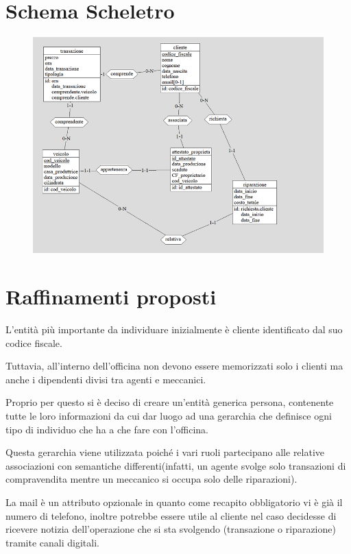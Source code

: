 \documentclass[a4paper,12pt]{report}
\begin{document}
\section{Schema Scheletro}
	\begin{figure}[H]
		\centering
		\includegraphics[scale=1]{img/schema_scheletro.png}
	\end{figure}

\section{Raffinamenti proposti}
L’entità più importante da individuare inizialmente è cliente identificato dal suo codice fiscale.

Tuttavia, all’interno dell’officina non devono essere memorizzati solo i clienti ma anche i dipendenti divisi tra agenti e meccanici.

Proprio per questo si è deciso di creare un’entità generica persona, contenente tutte le loro informazioni da cui dar luogo ad una
%
gerarchia che definisce ogni tipo di individuo che ha a che fare con l’officina.

Questa gerarchia viene utilizzata poiché i vari ruoli partecipano alle relative associazioni con semantiche differenti(infatti, un
%
agente svolge solo transazioni di compravendita mentre un meccanico si occupa solo delle riparazioni).

La mail è un attributo opzionale in quanto come recapito obbligatorio vi è già il numero di telefono, inoltre potrebbe essere utile al 
%
cliente nel caso decidesse di ricevere notizia dell’operazione che si sta svolgendo (transazione o riparazione) tramite canali digitali.
\end{document}
